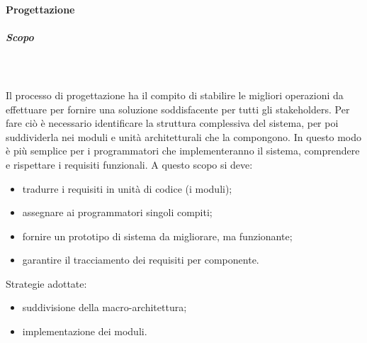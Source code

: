 	\paragraph{Progettazione}
			\subparagraph*{Scopo} \mbox{} \\ \mbox{} \\
		Il processo di progettazione ha il compito di stabilire le migliori operazioni da effettuare per fornire una soluzione soddisfacente per tutti gli stakeholders\glo. Per fare ciò è necessario identificare la struttura complessiva del sistema, per poi suddividerla nei moduli e unità architetturali che la compongono. In questo modo è più semplice per i programmatori che implementeranno il sistema, comprendere e rispettare i requisiti funzionali.
			A questo scopo si deve:
			\begin{itemize}
			\item tradurre i requisiti in unità di codice (i moduli);
			\item assegnare ai programmatori singoli compiti;
			\item fornire un prototipo di sistema da migliorare, ma funzionante;
			\item garantire il tracciamento dei requisiti per componente.
			\end{itemize}
			Strategie adottate:
			\begin{itemize}			
			\item suddivisione della macro-architettura;
			\item implementazione dei moduli.
			\end{itemize}

